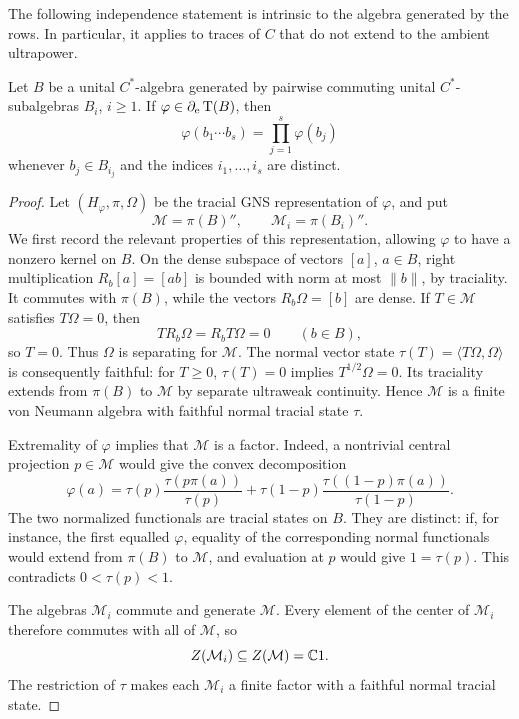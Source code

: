 The following independence statement is intrinsic to the algebra
generated by the rows. In particular, it applies to traces of \(C\)
that do not extend to the ambient ultrapower.

\begin{lemma}
\label{lem:factor-independence}
Let \(B\) be a unital \(C^*\)-algebra generated by pairwise commuting
unital \(C^*\)-subalgebras \(B_i\), \(i\geq1\). If
\(\varphi\in\partial_{\mathrm e}\operatorname{T}(B)\), then
\[
 \varphi(b_1\cdots b_s)=\prod_{j=1}^s\varphi(b_j)
\]
whenever \(b_j\in B_{i_j}\) and the indices \(i_1,\ldots,i_s\)
are distinct.
\end{lemma}

\begin{proof}
Let \((H_\varphi,\pi,\Omega)\) be the tracial GNS representation
of \(\varphi\), and put
\[
 \mathcal M=\pi(B)'',\qquad
 \mathcal M_i=\pi(B_i)''.
\]
We first record the relevant properties of this representation,
allowing \(\varphi\) to have a nonzero kernel on \(B\).
On the dense subspace of vectors \([a]\), \(a\in B\), right
multiplication \(R_b[a]=[ab]\) is bounded with norm at most
\(\|b\|\), by traciality. It commutes with \(\pi(B)\), while
the vectors \(R_b\Omega=[b]\) are dense. If
\(T\in\mathcal M\) satisfies \(T\Omega=0\), then
\[
 TR_b\Omega=R_bT\Omega=0\qquad(b\in B),
\]
so \(T=0\). Thus \(\Omega\) is separating for \(\mathcal M\).
The normal vector state
\(\tau(T)=\langle T\Omega,\Omega\rangle\) is consequently
faithful: for \(T\geq0\), \(\tau(T)=0\) implies
\(T^{1/2}\Omega=0\). Its traciality extends from \(\pi(B)\)
to \(\mathcal M\) by separate ultraweak continuity. Hence
\(\mathcal M\) is a finite von Neumann algebra with faithful
normal tracial state \(\tau\).

Extremality of \(\varphi\) implies that \(\mathcal M\) is a factor.
Indeed, a nontrivial central projection \(p\in\mathcal M\) would
give the convex decomposition
\[
 \varphi(a)
 =\tau(p)\frac{\tau(p\pi(a))}{\tau(p)}
  +\tau(1-p)\frac{\tau((1-p)\pi(a))}{\tau(1-p)}.
\]
The two normalized functionals are tracial states on \(B\). They are distinct:
if, for instance, the first equalled \(\varphi\), equality of
the corresponding normal functionals would extend from
\(\pi(B)\) to \(\mathcal M\), and evaluation at \(p\) would
give \(1=\tau(p)\). This contradicts
\(0<\tau(p)<1\).

The algebras \(\mathcal M_i\) commute and generate \(\mathcal M\).
Every element of the center of \(\mathcal M_i\) therefore
commutes with all of \(\mathcal M\), so
\[
 Z(\mathcal M_i)\subseteq Z(\mathcal M)=\mathbb C1.
\]
The restriction of \(\tau\) makes each \(\mathcal M_i\) a finite
factor with a faithful normal tracial state.


\end{proof}
